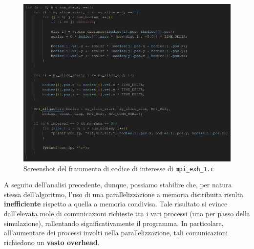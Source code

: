 \documentclass[12pt]{report}
\begin{document}
    \begin{figure}[H]
        \centering
        \includegraphics[width=\textwidth]{images/mpi_exh_1_3.png}
        \caption{Screenshot del frammento di codice di interesse di \texttt{mpi\_exh\_1.c}}
        \label{fig:mpi_exh_1_3}
    \end{figure}

    A seguito dell'analisi precedente, dunque, possiamo stabilire che, per natura stessa dell'algoritmo, l'uso di una parallelizzazione a memoria distribuita risulta \textbf{inefficiente} rispetto a quella a memoria condivisa. Tale risultato si evince dall'elevata mole di comunicazioni richieste tra i vari processi (una per passo della simulazione), rallentando significativamente il programma. In particolare, all'aumentare dei processi involti nella parallelizzazione, tali comunicazioni richiedono un \textbf{vasto overhead}.
\end{document}
